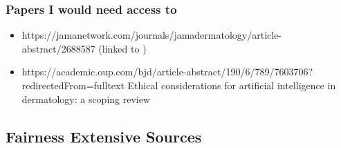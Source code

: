 \documentclass[12pt, a4paper, oneside]{book}   	%
\renewcommand{\paragraph}[1]{%
	\subsubsection*{#1}%
}
\newif\ifrawcitationactive
\newcommand{\rawcitationstart}{
	\color{purple}\rawcitationactivetrue
}
\newcommand{\rawcitationend}{
	\color{black}\rawcitationactivefalse
}
\begin{document}
			\paragraph{Papers I would need access to}
			\begin{itemize}
				\item https://jamanetwork.com/journals/jamadermatology/article-abstract/2688587 (linked to \autocite{Young_2020})
				\item https://academic.oup.com/bjd/article-abstract/190/6/789/7603706?redirectedFrom=fulltext Ethical considerations for artificial intelligence in dermatology: a scoping review
				
			\end{itemize}
			\rawcitationend
					
			\rawcitationstart
			\subsection{Fairness Extensive Sources}
\end{document}

